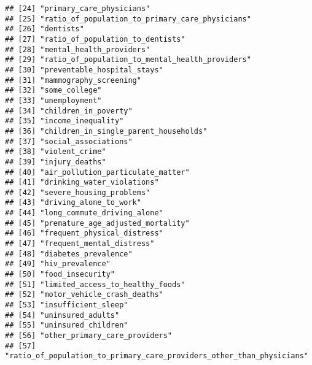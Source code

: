 \documentclass[
]{article}
\begin{document}
\begin{verbatim}
## [24] "primary_care_physicians"                                            
## [25] "ratio_of_population_to_primary_care_physicians"                     
## [26] "dentists"                                                           
## [27] "ratio_of_population_to_dentists"                                    
## [28] "mental_health_providers"                                            
## [29] "ratio_of_population_to_mental_health_providers"                     
## [30] "preventable_hospital_stays"                                         
## [31] "mammography_screening"                                              
## [32] "some_college"                                                       
## [33] "unemployment"                                                       
## [34] "children_in_poverty"                                                
## [35] "income_inequality"                                                  
## [36] "children_in_single_parent_households"                               
## [37] "social_associations"                                                
## [38] "violent_crime"                                                      
## [39] "injury_deaths"                                                      
## [40] "air_pollution_particulate_matter"                                   
## [41] "drinking_water_violations"                                          
## [42] "severe_housing_problems"                                            
## [43] "driving_alone_to_work"                                              
## [44] "long_commute_driving_alone"                                         
## [45] "premature_age_adjusted_mortality"                                   
## [46] "frequent_physical_distress"                                         
## [47] "frequent_mental_distress"                                           
## [48] "diabetes_prevalence"                                                
## [49] "hiv_prevalence"                                                     
## [50] "food_insecurity"                                                    
## [51] "limited_access_to_healthy_foods"                                    
## [52] "motor_vehicle_crash_deaths"                                         
## [53] "insufficient_sleep"                                                 
## [54] "uninsured_adults"                                                   
## [55] "uninsured_children"                                                 
## [56] "other_primary_care_providers"                                       
## [57] "ratio_of_population_to_primary_care_providers_other_than_physicians"

\end{verbatim}
\end{document}
